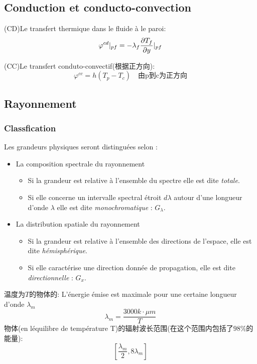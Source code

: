 \documentclass[openany]{book}
\begin{document}
\subsection{Conduction et conducto-convection}
(CD)Le transfert thermique dans le fluide \`a le paroi:
$$\varphi^{cd} |_{pf} = -\\\lambda _f \frac{\partial T_f}{\partial y}|_{pf}$$

(CC)Le transfert conduto-convectif(根据正方向):
$$\varphi ^{cc}=h(T_p - T_c) \quad \text{由p到c为正方向}$$

\subsection{Rayonnement}

\subsubsection{Classfication}
Les grandeurs physiques seront distinguées selon :
\begin{itemize}
\item La composition spectrale du rayonnement
    \begin{itemize}
        \item Si la grandeur est relative \`a l'ensemble du spectre elle est dite \textit{totale}.
        \item Si elle concerne un intervalle spectral \'etroit $d \lambda$  autour d'une longueur d'onde $\lambda$  elle est dite \textit{monochromatique} : $G_{\lambda }$.
    \end{itemize}

\item La distribution spatiale du rayonnement
    \begin{itemize}
        \item Si la grandeur est relative \`a l'ensemble des directions de l'espace, elle est dite \textit{h\'emisph\'erique}.
        \item Si elle caract\'erise une direction donn\'ee de propagation, elle est dite \textit{directionnelle} : $G_x$.
    \end{itemize}
\end{itemize}
温度为$T$的物体的:
L'\'energie \'emise est maximale pour une certaine longueur d'onde $\lambda _m$
$$\lambda _m=\frac{3000k\cdot \mu m}{T}$$
物体(en l\'equilibre de temp\'erature T)的辐射波长范围(在这个范围内包括了$98\%$的能量):
$$[\frac{\lambda _m }{2},8 \lambda _m]$$
\end{document}
